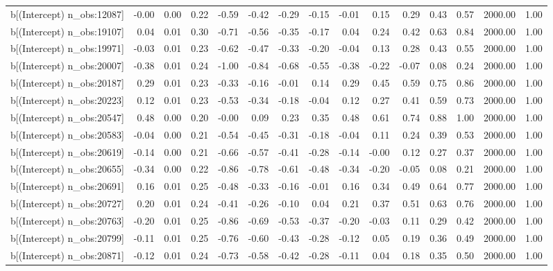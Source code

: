 \begin{table}[ht]
\begin{tabular}{rrrrrrrrrrrrrrr}
  b[(Intercept) n\_obs:12087] & -0.00 & 0.00 & 0.22 & -0.59 & -0.42 & -0.29 & -0.15 & -0.01 & 0.15 & 0.29 & 0.43 & 0.57 & 2000.00 & 1.00 \\ 
  b[(Intercept) n\_obs:19107] & 0.04 & 0.01 & 0.30 & -0.71 & -0.56 & -0.35 & -0.17 & 0.04 & 0.24 & 0.42 & 0.63 & 0.84 & 2000.00 & 1.00 \\ 
  b[(Intercept) n\_obs:19971] & -0.03 & 0.01 & 0.23 & -0.62 & -0.47 & -0.33 & -0.20 & -0.04 & 0.13 & 0.28 & 0.43 & 0.55 & 2000.00 & 1.00 \\ 
  b[(Intercept) n\_obs:20007] & -0.38 & 0.01 & 0.24 & -1.00 & -0.84 & -0.68 & -0.55 & -0.38 & -0.22 & -0.07 & 0.08 & 0.24 & 2000.00 & 1.00 \\ 
  b[(Intercept) n\_obs:20187] & 0.29 & 0.01 & 0.23 & -0.33 & -0.16 & -0.01 & 0.14 & 0.29 & 0.45 & 0.59 & 0.75 & 0.86 & 2000.00 & 1.00 \\ 
  b[(Intercept) n\_obs:20223] & 0.12 & 0.01 & 0.23 & -0.53 & -0.34 & -0.18 & -0.04 & 0.12 & 0.27 & 0.41 & 0.59 & 0.73 & 2000.00 & 1.00 \\ 
  b[(Intercept) n\_obs:20547] & 0.48 & 0.00 & 0.20 & -0.00 & 0.09 & 0.23 & 0.35 & 0.48 & 0.61 & 0.74 & 0.88 & 1.00 & 2000.00 & 1.00 \\ 
  b[(Intercept) n\_obs:20583] & -0.04 & 0.00 & 0.21 & -0.54 & -0.45 & -0.31 & -0.18 & -0.04 & 0.11 & 0.24 & 0.39 & 0.53 & 2000.00 & 1.00 \\ 
  b[(Intercept) n\_obs:20619] & -0.14 & 0.00 & 0.21 & -0.66 & -0.57 & -0.41 & -0.28 & -0.14 & -0.00 & 0.12 & 0.27 & 0.37 & 2000.00 & 1.00 \\ 
  b[(Intercept) n\_obs:20655] & -0.34 & 0.00 & 0.22 & -0.86 & -0.78 & -0.61 & -0.48 & -0.34 & -0.20 & -0.05 & 0.08 & 0.21 & 2000.00 & 1.00 \\ 
  b[(Intercept) n\_obs:20691] & 0.16 & 0.01 & 0.25 & -0.48 & -0.33 & -0.16 & -0.01 & 0.16 & 0.34 & 0.49 & 0.64 & 0.77 & 2000.00 & 1.00 \\ 
  b[(Intercept) n\_obs:20727] & 0.20 & 0.01 & 0.24 & -0.41 & -0.26 & -0.10 & 0.04 & 0.21 & 0.37 & 0.51 & 0.63 & 0.76 & 2000.00 & 1.00 \\ 
  b[(Intercept) n\_obs:20763] & -0.20 & 0.01 & 0.25 & -0.86 & -0.69 & -0.53 & -0.37 & -0.20 & -0.03 & 0.11 & 0.29 & 0.42 & 2000.00 & 1.00 \\ 
  b[(Intercept) n\_obs:20799] & -0.11 & 0.01 & 0.25 & -0.76 & -0.60 & -0.43 & -0.28 & -0.12 & 0.05 & 0.19 & 0.36 & 0.49 & 2000.00 & 1.00 \\ 
  b[(Intercept) n\_obs:20871] & -0.12 & 0.01 & 0.24 & -0.73 & -0.58 & -0.42 & -0.28 & -0.11 & 0.04 & 0.18 & 0.35 & 0.50 & 2000.00 & 1.00 \\ 

\end{tabular}
\end{table}
